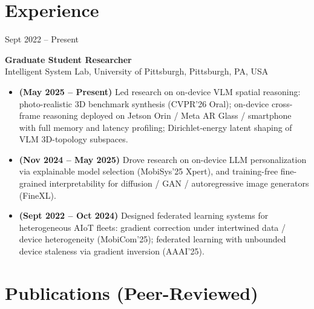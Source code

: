 \documentclass[11pt, letterpaper]{article}
\newenvironment{datedentry}[1]{%
  \par\noindent
  \begin{minipage}[t]{2.8cm}\raggedright\small #1\end{minipage}%
  \hspace{0.3cm}%
  \begin{minipage}[t]{\dimexpr\linewidth-3.1cm\relax}\raggedright
}{\end{minipage}\par\medskip}
\begin{document}
\section{Experience}

\begin{datedentry}{Sept 2022 -- Present}
\textbf{Graduate Student Researcher}\\
Intelligent System Lab, University of Pittsburgh, Pittsburgh, PA, USA
\begin{itemize}[leftmargin=1.1em, itemsep=2pt, topsep=3pt]
  \item \textbf{(May 2025 -- Present)} Led research on on-device VLM spatial reasoning: photo-realistic 3D benchmark synthesis (CVPR'26 Oral); on-device cross-frame reasoning deployed on Jetson Orin / Meta AR Glass / smartphone with full memory and latency profiling; Dirichlet-energy latent shaping of VLM 3D-topology subspaces.
  \item \textbf{(Nov 2024 -- May 2025)} Drove research on on-device LLM personalization via explainable model selection (MobiSys'25 Xpert), and training-free fine-grained interpretability for diffusion / GAN / autoregressive image generators (FineXL).
  \item \textbf{(Sept 2022 -- Oct 2024)} Designed federated learning systems for heterogeneous AIoT fleets: gradient correction under intertwined data / device heterogeneity (MobiCom'25); federated learning with unbounded device staleness via gradient inversion (AAAI'25).
\end{itemize}
\end{datedentry}

\section{Publications (Peer-Reviewed)}
\end{document}
